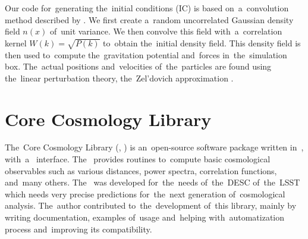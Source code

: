 Our code for~generating the~initial conditions (IC) is based on~a~convolution method described by \textcite{1997ApJ...490L.127P}. We first create a~random uncorrelated Gaussian density field $n(x)$ of~unit variance. We then convolve this field with~a~correlation kernel $W(k)=\sqrt{P(k)}$ to~obtain the~initial  density field. This density field is then used to~compute the~gravitation potential and~forces in~the~simulation box. The~actual positions and~velocities of~the~particles are found using the~linear perturbation theory, the~Zel'dovich approximation \parencite{1970A&A.....5...84Z}.
% 

\section{Core Cosmology Library}
The~Core Cosmology Library (, \textcite{2019ApJS..242....2C}) is an~open-source software package written in~, with~a~ interface. The~ provides routines to~compute basic cosmological observables such as various distances, power spectra, correlation functions, and~many others. The~ was developed for~the~needs of~the~DESC of~the~LSST which needs very precise predictions for~the~next generation of~cosmological analysis. The~author contributed to~the~development of~this library, mainly by writing documentation, examples of~usage and~helping with~automatization process and~improving its compatibility.

